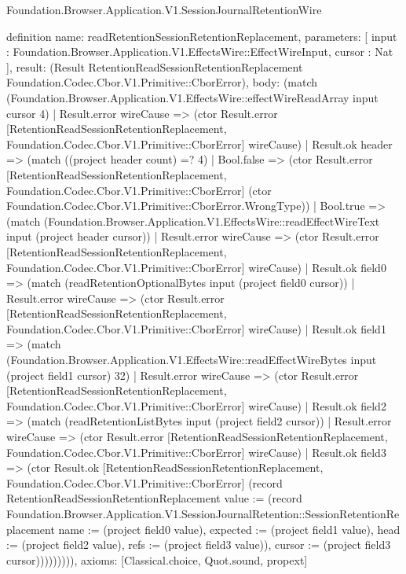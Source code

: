 \begin{lexlean}{Foundation.Browser.Application.V1.SessionJournalRetentionWire}
\begin{semanticmodule}
definition{
  name: readRetentionSessionRetentionReplacement,
  parameters: [
    input : Foundation.Browser.Application.V1.EffectsWire::EffectWireInput,
    cursor : Nat
  ],
  result: (Result RetentionReadSessionRetentionReplacement Foundation.Codec.Cbor.V1.Primitive::CborError),
  body: (match (Foundation.Browser.Application.V1.EffectsWire::effectWireReadArray input cursor 4)
    | Result.error wireCause => (ctor Result.error [RetentionReadSessionRetentionReplacement, Foundation.Codec.Cbor.V1.Primitive::CborError] wireCause)
    | Result.ok header => (match ((project header count) =? 4)
      | Bool.false => (ctor Result.error [RetentionReadSessionRetentionReplacement, Foundation.Codec.Cbor.V1.Primitive::CborError] (ctor Foundation.Codec.Cbor.V1.Primitive::CborError.WrongType))
      | Bool.true => (match (Foundation.Browser.Application.V1.EffectsWire::readEffectWireText input (project header cursor))
        | Result.error wireCause => (ctor Result.error [RetentionReadSessionRetentionReplacement, Foundation.Codec.Cbor.V1.Primitive::CborError] wireCause)
        | Result.ok field0 => (match (readRetentionOptionalBytes input (project field0 cursor))
          | Result.error wireCause => (ctor Result.error [RetentionReadSessionRetentionReplacement, Foundation.Codec.Cbor.V1.Primitive::CborError] wireCause)
          | Result.ok field1 => (match (Foundation.Browser.Application.V1.EffectsWire::readEffectWireBytes input (project field1 cursor) 32)
            | Result.error wireCause => (ctor Result.error [RetentionReadSessionRetentionReplacement, Foundation.Codec.Cbor.V1.Primitive::CborError] wireCause)
            | Result.ok field2 => (match (readRetentionListBytes input (project field2 cursor))
              | Result.error wireCause => (ctor Result.error [RetentionReadSessionRetentionReplacement, Foundation.Codec.Cbor.V1.Primitive::CborError] wireCause)
              | Result.ok field3 => (ctor Result.ok [RetentionReadSessionRetentionReplacement, Foundation.Codec.Cbor.V1.Primitive::CborError] (record RetentionReadSessionRetentionReplacement {value := (record Foundation.Browser.Application.V1.SessionJournalRetention::SessionRetentionReplacement {name := (project field0 value), expected := (project field1 value), head := (project field2 value), refs := (project field3 value)}), cursor := (project field3 cursor)})))))))),
  axioms: [Classical.choice, Quot.sound, propext]
}


\end{semanticmodule}
\end{lexlean}

